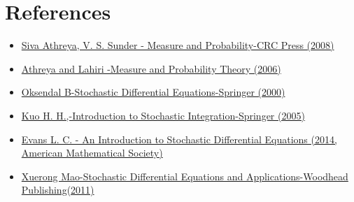 \documentclass{article}
\begin{document}
\section{References}
\begin{itemize}
    \item \href{https://drive.google.com/file/d/1pPIpvQBrxkK69bebNpvoupaZNODOAGIk/view?usp=drive_link}{Siva Athreya, V. S. Sunder - Measure and Probability-CRC Press (2008)}
    \item \href{https://www.dropbox.com/scl/fo/o18jjmcgnvwu23ye2wwba/h?dl=0&rlkey=0n9ibd9u21w8oykfg7hut3hyf}{Athreya and Lahiri -Measure and Probability Theory (2006)}
    \item \href{https://drive.google.com/file/d/1dDVWcERBHMOOmIBrovXGwt5KPLrIyRxC/view?usp=drive_link}{Oksendal B-Stochastic Differential Equations-Springer (2000)}
    \item \href{https://drive.google.com/file/d/1vRMD3PfWG5iZTjwdAeLyz3_fwPLslEyn/view?usp=drive_link}{Kuo H. H.,-Introduction to Stochastic Integration-Springer (2005)}
    \item \href{https://drive.google.com/file/d/1EiN6uab1nWAKvLPzE0VfQuoJ4vpF1bjM/view?usp=drive_link}{Evans L. C. - An Introduction to Stochastic Differential Equations (2014, American Mathematical Society)}
    \item \href{https://drive.google.com/file/d/1xmvYTdusN2AgJ88izdlyRi1nP0L7RGdY/view?usp=drive_link}{Xuerong Mao-Stochastic Differential Equations and Applications-Woodhead Publishing(2011)}
\end{itemize}
\end{document}
